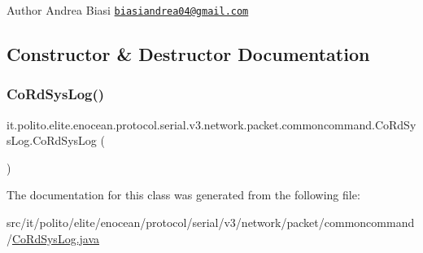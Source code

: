 \begin{DoxyAuthor}{Author}
Andrea Biasi \href{mailto:biasiandrea04@gmail.com}{\tt biasiandrea04@gmail.\+com} 
\end{DoxyAuthor}


\subsection{Constructor \& Destructor Documentation}
\hypertarget{classit_1_1polito_1_1elite_1_1enocean_1_1protocol_1_1serial_1_1v3_1_1network_1_1packet_1_1commoncommand_1_1_co_rd_sys_log_a93637ef900d9fd20540e22678f14d2d9}{}\label{classit_1_1polito_1_1elite_1_1enocean_1_1protocol_1_1serial_1_1v3_1_1network_1_1packet_1_1commoncommand_1_1_co_rd_sys_log_a93637ef900d9fd20540e22678f14d2d9} 
\subsubsection{\texorpdfstring{Co\+Rd\+Sys\+Log()}{CoRdSysLog()}}
{\footnotesize\ttfamily it.\+polito.\+elite.\+enocean.\+protocol.\+serial.\+v3.\+network.\+packet.\+commoncommand.\+Co\+Rd\+Sys\+Log.\+Co\+Rd\+Sys\+Log (\begin{DoxyParamCaption}{ }\end{DoxyParamCaption})}



The documentation for this class was generated from the following file\+:\begin{DoxyCompactItemize}
\item 
src/it/polito/elite/enocean/protocol/serial/v3/network/packet/commoncommand/\hyperlink{_co_rd_sys_log_8java}{Co\+Rd\+Sys\+Log.\+java}\end{DoxyCompactItemize}
